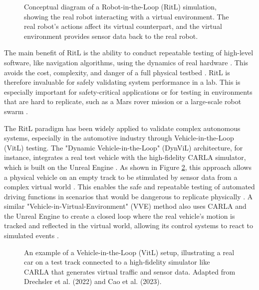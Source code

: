 \begin{figure}[h]
\centering
\caption{Conceptual diagram of a Robot-in-the-Loop (RitL) simulation, showing the real robot interacting with a virtual environment. The real robot's actions affect its virtual counterpart, and the virtual environment provides sensor data back to the real robot.}
\label{fig:ritl_concept}
\end{figure}

The main benefit of RitL is the ability to conduct repeatable testing of high-level software, like navigation algorithms, using the dynamics of real hardware \cite{Mihalic2022}. This avoids the cost, complexity, and danger of a full physical testbed \cite{Mihalic2022}. RitL is therefore invaluable for safely validating system performance in a lab. This is especially important for safety-critical applications or for testing in environments that are hard to replicate, such as a Mars rover mission or a large-scale robot swarm \cite{Hu05, Mihalic2022}.



The RitL paradigm has been widely applied to validate complex autonomous systems, especially in the automotive industry through Vehicle-in-the-Loop (VitL) testing. The "Dynamic Vehicle-in-the-Loop" (DynViL) architecture, for instance, integrates a real test vehicle with the high-fidelity CARLA simulator, which is built on the Unreal Engine \cite{DSR22}. As shown in Figure \ref{fig:vitl_setup}, this approach allows a physical vehicle on an empty track to be stimulated by sensor data from a complex virtual world \cite{DSR22}. This enables the safe and repeatable testing of automated driving functions in scenarios that would be dangerous to replicate physically \cite{DSR22}. A similar "Vehicle-in-Virtual-Environment" (VVE) method also uses CARLA and the Unreal Engine to create a closed loop where the real vehicle's motion is tracked and reflected in the virtual world, allowing its control systems to react to simulated events \cite{Cao2023}.

\begin{figure}[h]
\centering
\caption{An example of a Vehicle-in-the-Loop (VitL) setup, illustrating a real car on a test track connected to a high-fidelity simulator like CARLA that generates virtual traffic and sensor data. Adapted from Drechsler et al. (2022) and Cao et al. (2023).}
\label{fig:vitl_setup}
\end{figure}

